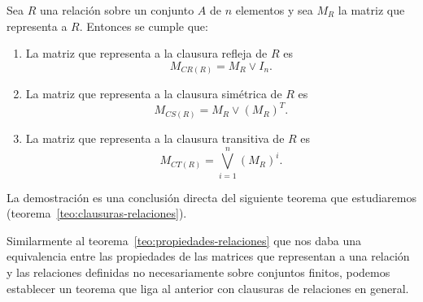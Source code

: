 \begin{teorema}
\label{teo:clausuras-matrices-relaciones}
Sea $R$ una relación sobre un conjunto $A$ de $n$ elementos y sea $M_R$ la matriz que representa a $R$.
Entonces se cumple que:
\begin{enumerate}
  \itemsep 0pt
  \item La matriz que representa a la clausura refleja de $R$ es $$M_{CR(R)}=M_R\vee I_n.$$
  \item La matriz que representa a la clausura simétrica de $R$ es $$M_{CS(R)}=M_R\vee (M_R)^T.$$
  \item La matriz que representa a la clausura transitiva de $R$ es $$M_{CT(R)}=\bigvee_{i=1}^n(M_R)^i.$$ 
\end{enumerate}
\begin{demostracion}
La demostración es una conclusión directa del siguiente teorema que estudiaremos (teorema~\ref{teo:clausuras-relaciones}).
\end{demostracion}
\end{teorema}

Similarmente al teorema~\ref{teo:propiedades-relaciones} que nos daba una equivalencia entre las propiedades de las matrices que representan a una relación y las relaciones definidas no necesariamente sobre conjuntos finitos, podemos establecer un teorema que liga al anterior con clausuras de relaciones en general.


